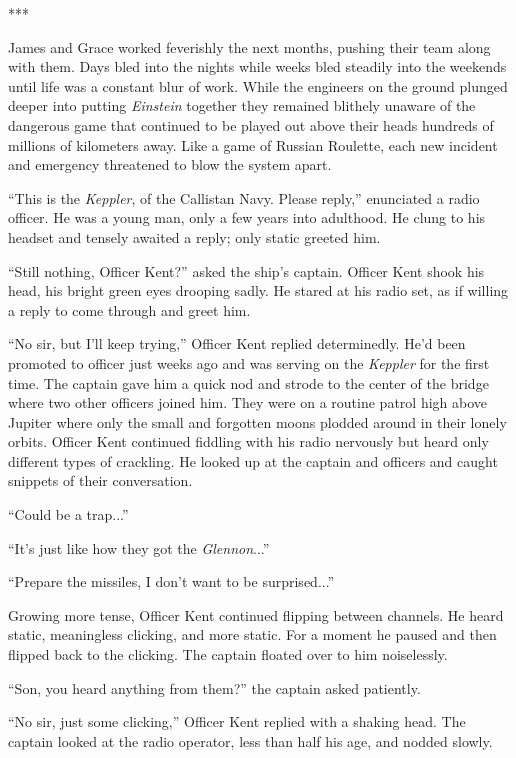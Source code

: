 \documentclass[12pt]{article} %
\begin{document}
\begin{center}
***
\end{center}

James and Grace worked feverishly the next months, pushing their team along with them. Days bled into the nights while weeks bled steadily into the weekends until life was a constant blur of work. While the engineers on the ground plunged deeper into putting \textit{Einstein} together they remained blithely unaware of the dangerous game that continued to be played out above their heads hundreds of millions of kilometers away. Like a game of Russian Roulette, each new incident and emergency threatened to blow the system apart. 

``This is the \textit{Keppler}, of the Callistan Navy. Please reply,'' enunciated a radio officer. He was a young man, only a few years into adulthood. He clung to his headset and tensely awaited a reply; only static greeted him.

``Still nothing, Officer Kent?'' asked the ship's captain. Officer Kent shook his head, his bright green eyes drooping sadly. He stared at his radio set, as if willing a reply to come through and greet him.

``No sir, but I'll keep trying,'' Officer Kent replied determinedly. He'd been promoted to officer just weeks ago and was serving on the \textit{Keppler} for the first time.  The captain gave him a quick nod and strode to the center of the bridge where two other officers joined him. They were on a routine patrol high above Jupiter where only the small and forgotten moons plodded around in their lonely orbits. Officer Kent continued fiddling with his radio nervously but heard only different types of crackling. He looked up at the captain and officers and caught snippets of their conversation.

``Could be a trap...''

``It's just like how they got the \textit{\textit{Glennon}}...''

``Prepare the missiles, I don't want to be surprised...''

Growing more tense, Officer Kent continued flipping between channels. He heard static, meaningless clicking, and more static. For a moment he paused and then flipped back to the clicking. The captain floated over to him noiselessly.

``Son, you heard anything from them?'' the captain asked patiently.

``No sir, just some clicking,'' Officer Kent replied with a shaking head. The captain looked at the radio operator, less than half his age, and nodded slowly.
\end{document}
